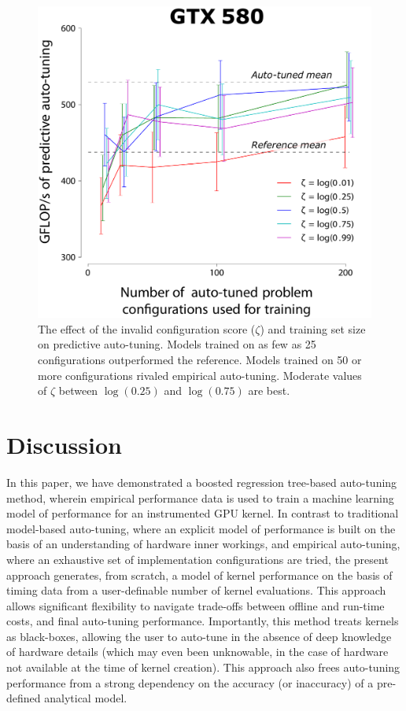 \documentclass{sig-alternate}
\begin{document}
\begin{figure}[!t]
\centering
\includegraphics[width=\linewidth]{illustrator/fig_ntrain_munctional0_580.pdf} %
\caption{The effect of the invalid configuration score ($\zeta$) and training set
size on predictive auto-tuning.
Models trained on as few as 25 configurations outperformed the reference.
Models trained on 50 or more configurations rivaled empirical auto-tuning.
Moderate values of $\zeta$ between $\log(0.25)$ and $\log(0.75)$ are best.
}
\label{fig:fig_ntrain}
\end{figure}


\section{Discussion}
\label{sec:discuss}

In this paper, we have demonstrated a boosted regression tree-based auto-tuning
method, wherein empirical performance data is used to train a machine learning
model of performance for an instrumented GPU kernel.  In contrast to
traditional model-based auto-tuning, where an explicit model of performance is
built on the basis of an understanding of hardware inner workings, and
empirical auto-tuning, where an exhaustive set of implementation configurations
are tried, the present approach generates, from scratch, a model of kernel
performance on the basis of timing data from a user-definable number of kernel
evaluations.  This approach allows significant flexibility to navigate
trade-offs between offline and run-time costs, and final auto-tuning
performance.  Importantly, this method treats kernels as black-boxes, allowing
the user to auto-tune in the absence of deep knowledge of hardware details
(which may even been unknowable, in the case of hardware not available at the
time of kernel creation).  This approach also frees auto-tuning performance
from a strong dependency on the accuracy (or inaccuracy) of a pre-defined
analytical model.
\end{document}
